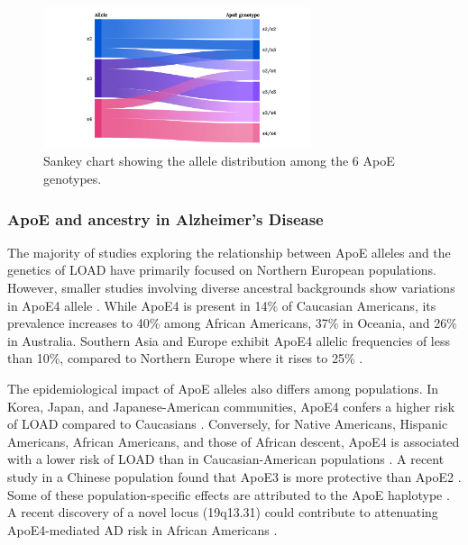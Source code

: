 \documentclass{amsart}
\begin{document}
\begin{figure}[H]
  \includegraphics[width=0.7\textwidth]{figures/ApoE@2x.png}
    \caption{Sankey chart showing the allele distribution among the 6 ApoE genotypes.}
  \label{fig1}
\end{figure}

\subsubsection{ApoE and ancestry in Alzheimer's Disease}
The majority of studies exploring the relationship between ApoE alleles and the genetics of LOAD have primarily focused on Northern European populations\cite{Yang2023ApolipoproteinDisease}. However, smaller studies involving diverse ancestral backgrounds show variations in ApoE4 allele \cite{Yang2023ApolipoproteinDisease}. While ApoE4 is present in 14\% of Caucasian Americans, its prevalence increases to 40\% among African Americans, 37\% in Oceania, and 26\% in Australia. Southern Asia and Europe exhibit ApoE4 allelic frequencies of less than 10\%, compared to Northern Europe where it rises to 25\% \cite{Belloy2019AForward, Egert2012ApoEFactors, Eisenberg2010WorldwideHistory, Logue2011AAmericans}.

The epidemiological impact of ApoE alleles also differs among populations. In Korea, Japan, and Japanese-American communities, ApoE4 confers a higher risk of LOAD compared to Caucasians \cite{Farrer1997EffectsMeta-analysis}. Conversely, for Native Americans, Hispanic Americans, African Americans, and those of African descent, ApoE4 is associated with a lower risk of LOAD than in Caucasian-American populations \cite{Farrer1997EffectsMeta-analysis, Blue2019LocalHispanics, Suchy-Dicey2022APOEStudy, Rajabli2018AncestralPopulations, Naslavsky2022GlobalSample}. A recent study in a Chinese population found that ApoE3 is more protective than ApoE2 \cite{Chen2011ApolipoproteinDisease}. Some of these population-specific effects are attributed to the ApoE haplotype \cite{Blue2019LocalHispanics, Rajabli2018AncestralPopulations}. A recent discovery of a novel locus (19q13.31) could contribute to attenuating ApoE4-mediated AD risk in African Americans \cite{Rajabli2022AAncestry}.
\end{document}
